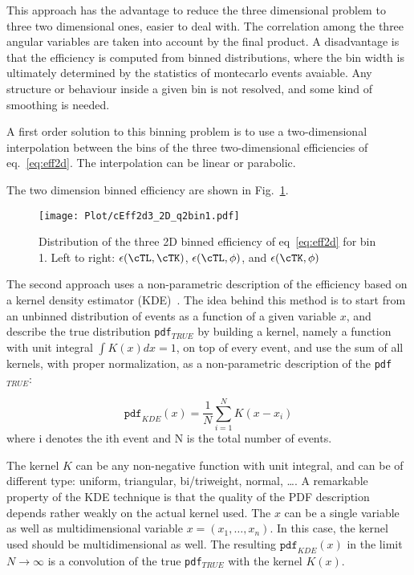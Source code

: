 This approach has the advantage to reduce the three dimensional problem to
three two dimensional ones, easier to deal with.  The correlation among the
three angular variables are taken into account by the final product.
A disadvantage is that the efficiency is computed from binned distributions,
where the bin width is ultimately determined by the statistics of montecarlo
events avaiable.  Any structure or behaviour inside a given bin is not
resolved, and some kind of smoothing is needed.

A first order solution to this binning problem is to use a two-dimensional
interpolation between the bins of the three two-dimensional efficiencies of
eq.~\ref{eq:eff2d}. The interpolation can be linear or parabolic.

The two dimension binned efficiency are shown in Fig.~\ref{fig:eff2D}.

\begin{figure}[hbt]
    \texttt{[image: Plot/cEff2d3\_2D\_q2bin1.pdf]}

    \caption{Distribution of the three 2D binned efficiency of
        eq~\ref{eq:eff2d} for bin 1. Left to right: $\epsilon(\cTL,\cTK)$,
        $\epsilon(\cTL,\phi)$, and $\epsilon(\cTK,\phi)$}
    \label{fig:eff2D}
\end{figure}

The second approach uses a non-parametric description of the
efficiency based on a kernel density estimator
(KDE)~\cite{opac-b1089297,Cranmer:2000du}.  The idea behind this
method is to start from an unbinned distribution of events as a
function of a given variable $x$, and describe the true distribution
\texttt{pdf}$_{TRUE}$ by building a kernel, namely a function with
unit integral $\int{K(x)dx}=1$, on top of every event, and use the sum
of all kernels, with proper normalization, as a non-parametric
description of the \texttt{pdf}$_{TRUE}$:

\begin{equation}\label{eq:KDE}
    \mathtt{pdf}_{KDE}(x)=\frac{1}{N}\sum_{i=1}^{N} K(x-x_i)
\end{equation}
where i denotes the ith event and N is the total number of events.

The kernel $K$ can be any non-negative function with unit integral, and can be
of different type: uniform, triangular, bi/triweight, normal, \ldots. A
remarkable property of the KDE technique is that the quality of the PDF
description depends rather weakly on the actual kernel used.
The $x$ can be a single variable as well as multidimensional variable
$x=(x_1,\ldots,x_n)$. In this case, the kernel used should be multidimensional
as well. The resulting $\mathtt{pdf}_{KDE}(x)$ in the limit $N\to\infty$ 
is a convolution of the true \texttt{pdf}$_{TRUE}$ with the kernel $K(x)$.


